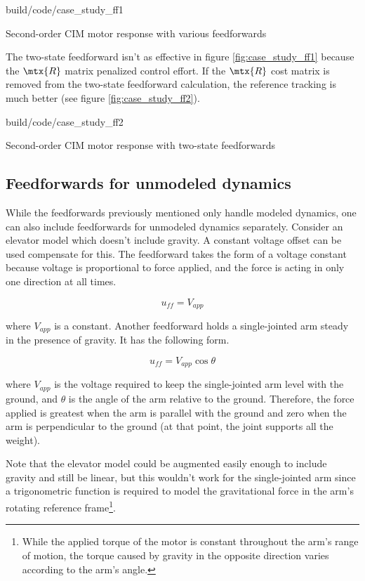 \begin{svg}{build/code/case_study_ff1}
  \caption{Second-order CIM motor response with various feedforwards}
  \label{fig:case_study_ff1}
\end{svg}

The two-state feedforward isn't as effective in figure \ref{fig:case_study_ff1}
because the $\mtx{R}$ matrix penalized \gls{control effort}. If the $\mtx{R}$
cost matrix is removed from the two-state feedforward calculation, the
\gls{reference} \gls{tracking} is much better (see figure
\ref{fig:case_study_ff2}).

\begin{svg}{build/code/case_study_ff2}
  \caption{Second-order CIM motor response with two-state feedforwards}
  \label{fig:case_study_ff2}
\end{svg}

\subsection{Feedforwards for unmodeled dynamics}

While the feedforwards previously mentioned only handle modeled dynamics, one
can also include feedforwards for unmodeled dynamics separately. Consider an
elevator model which doesn't include gravity. A constant voltage offset can be
used compensate for this. The feedforward takes the form of a voltage constant
because voltage is proportional to force applied, and the force is acting in
only one direction at all times.

\begin{equation}
  u_{ff} = V_{app}
\end{equation}

where $V_{app}$ is a constant. Another feedforward holds a single-jointed arm
steady in the presence of gravity. It has the following form.

\begin{equation}
  u_{ff} = V_{app} \cos\theta
\end{equation}

where $V_{app}$ is the voltage required to keep the single-jointed arm level
with the ground, and $\theta$ is the angle of the arm relative to the ground.
Therefore, the force applied is greatest when the arm is parallel with the
ground and zero when the arm is perpendicular to the ground (at that point, the
joint supports all the weight).

Note that the elevator model could be augmented easily enough to include gravity
and still be linear, but this wouldn't work for the single-jointed arm since a
trigonometric function is required to model the gravitational force in the arm's
rotating reference frame\footnote{While the applied torque of the motor is
constant throughout the arm's range of motion, the torque caused by gravity in
the opposite direction varies according to the arm's angle.}.

